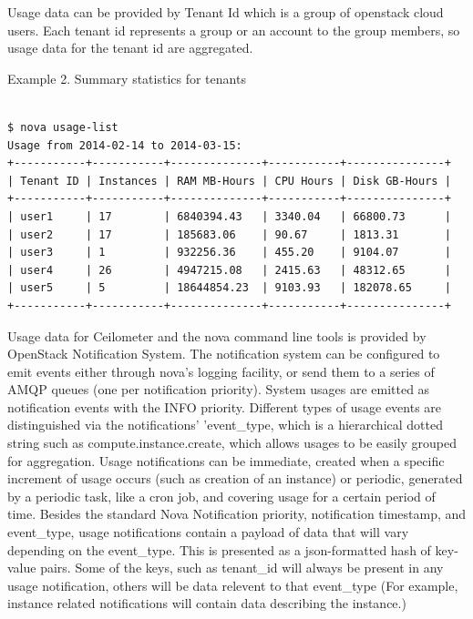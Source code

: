 \documentclass{sig-alternate}
\begin{document}
Usage data can be provided by Tenant Id which is a group of openstack cloud users. Each tenant id represents a group or an account to the group members, so usage data for the tenant id are aggregated. \newline

Example 2. Summary statistics for tenants

\begin{lstlisting}

$ nova usage-list
Usage from 2014-02-14 to 2014-03-15:
+-----------+-----------+--------------+-----------+---------------+
| Tenant ID | Instances | RAM MB-Hours | CPU Hours | Disk GB-Hours |
+-----------+-----------+--------------+-----------+---------------+
| user1     | 17        | 6840394.43   | 3340.04   | 66800.73      |
| user2     | 17        | 185683.06    | 90.67     | 1813.31       |
| user3     | 1         | 932256.36    | 455.20    | 9104.07       |
| user4     | 26        | 4947215.08   | 2415.63   | 48312.65      |
| user5     | 5         | 18644854.23  | 9103.93   | 182078.65     |
+-----------+-----------+--------------+-----------+---------------+

\end{lstlisting}

Usage data for Ceilometer and the nova command line tools is provided by OpenStack Notification System. The notification system can be configured to emit events either through nova's logging facility, or send them to a series of AMQP queues (one per notification priority). System usages are emitted as notification events with the INFO priority. Different types of usage events are distinguished via the notifications' 'event\_type, which is a hierarchical dotted string such as compute.instance.create, which allows usages to be easily grouped for aggregation. Usage notifications can be immediate, created when a specific increment of usage occurs (such as creation of an instance) or periodic, generated by a periodic task, like a cron job, and covering usage for a certain period of time. Besides the standard Nova Notification priority, notification timestamp, and event\_type, usage notifications contain a payload of data that will vary depending on the event\_type. This is presented as a json-formatted hash of key-value pairs. Some of the keys, such as tenant\_id will always be present in any usage notification, others will be data relevent to that event\_type (For example, instance related notifications will contain data describing the instance.) ~\cite{SystemUsageData}
\end{document}
